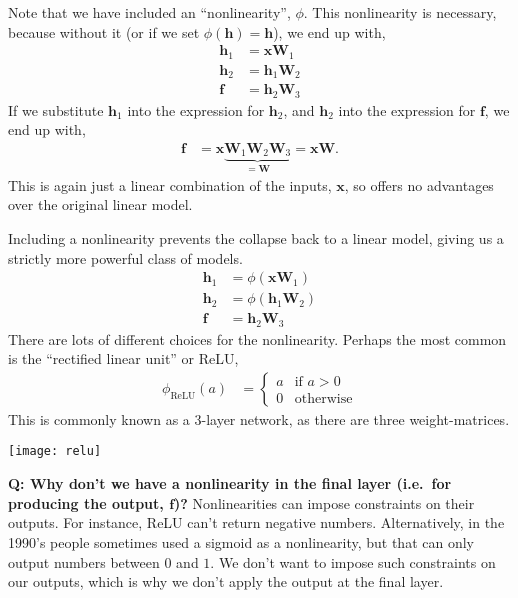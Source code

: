 \documentclass{article}
\newcommand{\x}{\mathbf{x}}
\newcommand{\f}{\mathbf{f}}
\newcommand{\h}{\mathbf{h}}
\newcommand{\W}{\mathbf{W}}
\begin{document}
Note that we have included an ``nonlinearity'', $\phi$.
This nonlinearity is necessary, because without it (or if we set $\phi(\h) = \h$), we end up with,
\begin{subequations}
\begin{align}
  \h_1 &= \x \W_1\\
  \h_2 &= \h_1 \W_2\\
  \f &= \h_2 \W_3
\end{align}
\end{subequations}
If we substitute $\h_1$ into the expression for $\h_2$, and $\h_2$ into the expression for $\f$, we end up with,
\begin{align}
  \f &= \x \underbrace{\W_1 \W_2 \W_3}_{=\W} = \x \W.
\end{align}
This is again just a linear combination of the inputs, $\x$, so offers no advantages over the original linear model.

Including a nonlinearity prevents the collapse back to a linear model, giving us a strictly more powerful class of models.
\begin{subequations}
\begin{align}
  \h_1 &= \phi(\x \W_1)\\
  \h_2 &= \phi(\h_1 \W_2)\\
  \f &= \h_2 \W_3
\end{align}
\end{subequations}
There are lots of different choices for the nonlinearity.  Perhaps the most common is the ``rectified linear unit'' or ReLU,
\begin{align}
  \phi_\text{ReLU}(a) &= \begin{cases}    
    a & \text{if } a > 0\\
    0 & \text{otherwise}
  \end{cases}  
\end{align}
This is commonly known as a 3-layer network, as there are three weight-matrices.

\begin{center}
  \texttt{[image: relu]}
\end{center}

\textbf{Q: Why don't we have a nonlinearity in the final layer (i.e.\ for producing the output, $\f$)?}
Nonlinearities can impose constraints on their outputs.
For instance, ReLU can't return negative numbers.
Alternatively, in the 1990's people sometimes used a sigmoid as a nonlinearity, but that can only output numbers between $0$ and $1$.
We don't want to impose such constraints on our outputs, which is why we don't apply the output at the final layer.
\end{document}
